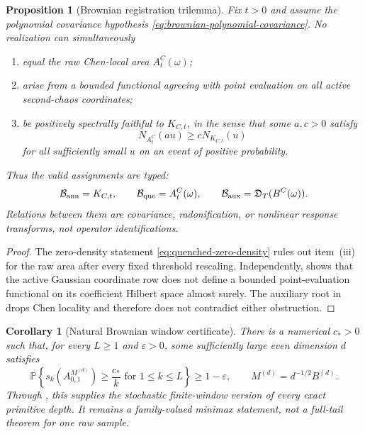 \documentclass[10pt,reqno]{amsart}
\theoremstyle{plain}
\newtheorem{proposition}[theorem]{Proposition}
\newtheorem{corollary}[theorem]{Corollary}
\theoremstyle{definition}
\theoremstyle{remark}
\begin{document}
\begin{proposition}[Brownian registration trilemma]
\label{prop:compact-brownian-trilemma}
Fix $t>0$ and assume the polynomial covariance hypothesis
\eqref{eq:brownian-polynomial-covariance}.  No realization can simultaneously
\begin{enumerate}[label=\textup{(\roman*)},leftmargin=2.8em]
\item equal the raw Chen-local area $A_t^C(\omega)$;
\item arise from a bounded functional agreeing with point evaluation on all
      active second-chaos coordinates;
\item be positively spectrally faithful to $K_{C,t}$, in the sense that some
      $a,c>0$ satisfy
      \[
       N_{A_t^C}(au)\ge cN_{K_{C,t}}(u)
      \]
      for all sufficiently small $u$ on an event of positive probability.
\end{enumerate}
Thus the valid assignments are typed:
\[
 \mathcal B_{\rm ann}=K_{C,t},\qquad
 \mathcal B_{\rm que}=A_t^C(\omega),\qquad
 \mathcal B_{\rm aux}=\mathfrak D_T(B^C(\omega)).
\]
Relations between them are covariance, radonification, or nonlinear response
transforms, not operator identifications.
\end{proposition}

\begin{proof}
The zero-density statement \eqref{eq:quenched-zero-density} rules out
item~\textup{(iii)} for the raw area after every fixed threshold rescaling.
Independently,  shows that the
active Gaussian coordinate row does not define a bounded point-evaluation
functional on its coefficient Hilbert space almost surely.  The auxiliary
root in  drops Chen locality and
therefore does not contradict either obstruction.
\end{proof}

\begin{corollary}[Natural Brownian window certificate]
\label{cor:compact-brownian-window}
There is a numerical $c_*>0$ such that, for every $L\ge1$ and
$\varepsilon>0$, some sufficiently large even dimension $d$ satisfies
\begin{equation}
 \mathbb P\left\{
  s_k(A^{M^{(d)}}_{0,1})\ge\frac{c_*}{k}
  \text{ for }1\le k\le L\right\}\ge1-\varepsilon,
 \qquad M^{(d)}=d^{-1/2}B^{(d)}.
 \label{eq:compact-brownian-window-certificate}
\end{equation}
Through , this supplies the stochastic
finite-window version of every exact primitive depth.  It remains a
family-valued minimax statement, not a full-tail theorem for one raw sample.
\end{corollary}
\end{document}
